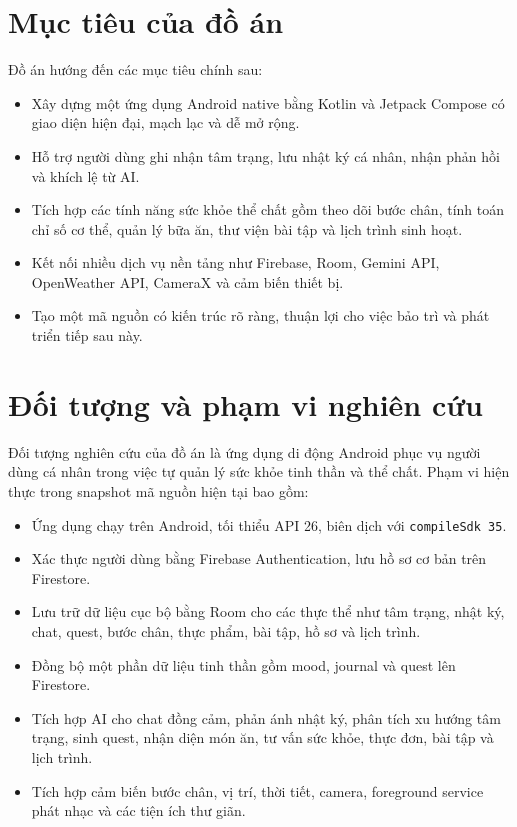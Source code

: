 \documentclass{zenbuddy-report}
\begin{document}
\section{Mục tiêu của đồ án}
Đồ án hướng đến các mục tiêu chính sau:
\begin{itemize}
  \item Xây dựng một ứng dụng Android native bằng Kotlin và Jetpack Compose có giao diện hiện đại, mạch lạc và dễ mở rộng.
  \item Hỗ trợ người dùng ghi nhận tâm trạng, lưu nhật ký cá nhân, nhận phản hồi và khích lệ từ AI.
  \item Tích hợp các tính năng sức khỏe thể chất gồm theo dõi bước chân, tính toán chỉ số cơ thể, quản lý bữa ăn, thư viện bài tập và lịch trình sinh hoạt.
  \item Kết nối nhiều dịch vụ nền tảng như Firebase, Room, Gemini API, OpenWeather API, CameraX và cảm biến thiết bị.
  \item Tạo một mã nguồn có kiến trúc rõ ràng, thuận lợi cho việc bảo trì và phát triển tiếp sau này.
\end{itemize}

\section{Đối tượng và phạm vi nghiên cứu}
Đối tượng nghiên cứu của đồ án là ứng dụng di động Android phục vụ người dùng cá nhân trong việc tự quản lý sức khỏe tinh thần và thể chất. Phạm vi hiện thực trong snapshot mã nguồn hiện tại bao gồm:
\begin{itemize}
  \item Ứng dụng chạy trên Android, tối thiểu API 26, biên dịch với \texttt{compileSdk 35}.
  \item Xác thực người dùng bằng Firebase Authentication, lưu hồ sơ cơ bản trên Firestore.
  \item Lưu trữ dữ liệu cục bộ bằng Room cho các thực thể như tâm trạng, nhật ký, chat, quest, bước chân, thực phẩm, bài tập, hồ sơ và lịch trình.
  \item Đồng bộ một phần dữ liệu tinh thần gồm mood, journal và quest lên Firestore.
  \item Tích hợp AI cho chat đồng cảm, phản ánh nhật ký, phân tích xu hướng tâm trạng, sinh quest, nhận diện món ăn, tư vấn sức khỏe, thực đơn, bài tập và lịch trình.
  \item Tích hợp cảm biến bước chân, vị trí, thời tiết, camera, foreground service phát nhạc và các tiện ích thư giãn.
\end{itemize}
\end{document}
